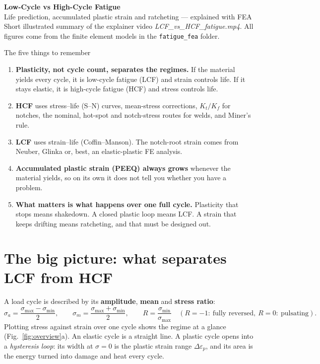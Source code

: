 \documentclass[10pt,a4paper]{article}
\begin{document}
\begin{tcolorbox}[enhanced,colback=ctxt,colframe=ctxt,arc=1.5mm,left=10pt,right=10pt,top=7pt,bottom=7pt]
{\color{white}\LARGE\bfseries Low-Cycle vs High-Cycle Fatigue}\\[2pt]
{\color{white!80!cblue}\large Life prediction, accumulated plastic strain and ratcheting — explained with FEA}\\[4pt]
{\color{white!70!ctxt}\small Short illustrated summary of the explainer video \textit{LCF\_vs\_HCF\_fatigue.mp4}. All figures come from the finite element models in the \texttt{fatigue\_fea} folder.}
\end{tcolorbox}

\begin{keybox}[cblue]{The five things to remember}
\begin{enumerate}[leftmargin=12pt,itemsep=0pt]
\item \textbf{Plasticity, not cycle count, separates the regimes.} If the material yields every cycle, it is low-cycle fatigue (LCF) and strain controls life. If it stays elastic, it is high-cycle fatigue (HCF) and stress controls life.
\item \textbf{HCF} uses stress–life (S–N) curves, mean-stress corrections, $K_t/K_f$ for notches, the nominal, hot-spot and notch-stress routes for welds, and Miner's rule.
\item \textbf{LCF} uses strain–life (Coffin–Manson). The notch-root strain comes from Neuber, Glinka or, best, an elastic-plastic FE analysis.
\item \textbf{Accumulated plastic strain (PEEQ) always grows} whenever the material yields, so on its own it does not tell you whether you have a problem.
\item \textbf{What matters is what happens over one full cycle.} Plasticity that stops means \textcolor{cgreen}{shakedown}. A closed plastic loop means \textcolor{corange}{LCF}. A strain that keeps drifting means \textcolor{cred}{ratcheting}, and that must be designed out.
\end{enumerate}
\end{keybox}

\section{The big picture: what separates LCF from HCF}
A load cycle is described by its \textbf{amplitude}, \textbf{mean} and \textbf{stress ratio}:
\begin{equation*}
\sigma_a=\frac{\sigma_{\max}-\sigma_{\min}}{2},\qquad
\sigma_m=\frac{\sigma_{\max}+\sigma_{\min}}{2},\qquad
R=\frac{\sigma_{\min}}{\sigma_{\max}}\quad(R=-1:\ \text{fully reversed},\ R=0:\ \text{pulsating}).
\end{equation*}
Plotting stress against strain over one cycle shows the regime at a glance (Fig.~\ref{fig:overview}a). An elastic cycle is a straight line. A plastic cycle opens into a \emph{hysteresis loop}: its width at $\sigma=0$ is the plastic strain range $\Delta\varepsilon_p$, and its area is the energy turned into damage and heat every cycle.
\end{document}
